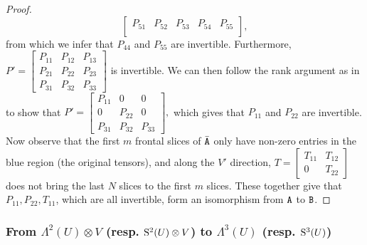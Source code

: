\begin{proof}
$$\begin{bmatrix}
	P_{51} & P_{52} & P_{53} & P_{54} & P_{55}\\
\end{bmatrix},$$
from which we infer that $P_{44}$ and $P_{55}$ are invertible. Furthermore, 
$P'=\begin{bmatrix}
	P_{11} & P_{12} & P_{13}\\
	P_{21} & P_{22} & P_{23}\\
	P_{31} & P_{32} & P_{33}
\end{bmatrix}
$ is invertible. We can then follow the rank argument as 
in \cite[Proposition 5.1]{TI1} 
to show that 
$P'=\begin{bmatrix}
	P_{11} & 0 & 0\\
	0 & P_{22} & 0\\
	P_{31} & P_{32} & P_{33}
\end{bmatrix},
$ which gives that $P_{11}$ and $P_{22}$ are invertible. Now observe that the first $m$ frontal slices of $\bar\tA$ only have non-zero entries in the blue region (the original tensors), and along the $V'$ direction, $T=\begin{bmatrix}
	T_{11} & T_{12} \\
	0 & T_{22}
\end{bmatrix}$ does not bring the last $N$ slices to the first $m$ slices. These together give that $P_{11}, P_{22}, T_{11}$, which are all invertible, form an isomorphism from $\tA$ to $\tB$.
\end{proof}
%
%

\subsubsection{From $\Lambda^2(U)\otimes V$ (resp. $\S^2(U)\otimes V$) to $\Lambda^3(U)$ (resp. $\S^3(U)$) }\label{subsec:S3U}

